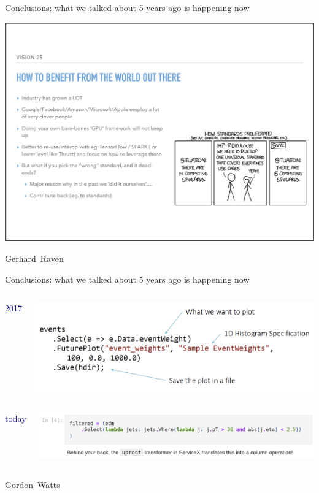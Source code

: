 \documentclass[aspectratio=169]{beamer}
\begin{document}
\begin{frame}{Conclusions: what we talked about 5 years ago is happening now}
\vspace{0.25 cm}
\begin{center}
\includegraphics[width=0.77\linewidth]{PLOTS/gerhard-raven-in-2017.png}
\end{center}

\vspace{-1.25 cm}
\hfill \mbox{Gerhard Raven\hspace{-0.5 cm}}
\vspace{1.25 cm}
\end{frame}

\begin{frame}{Conclusions: what we talked about 5 years ago is happening now}
\vspace{0.25 cm}
\begin{columns}
\hfill \textcolor{darkblue}{\LARGE 2017}

\includegraphics[width=\linewidth]{PLOTS/linq-in-2017.png}
\end{columns}

\vspace{0.5 cm}
\begin{columns}
\hfill \textcolor{darkblue}{\LARGE today}

\includegraphics[width=\linewidth]{PLOTS/linq-in-2022.png}
\end{columns}

\vspace{0.25 cm}
\hfill \mbox{Gordon Watts\hspace{-0.5 cm}}
\vspace{-0.25 cm}
\end{frame}
\end{document}
